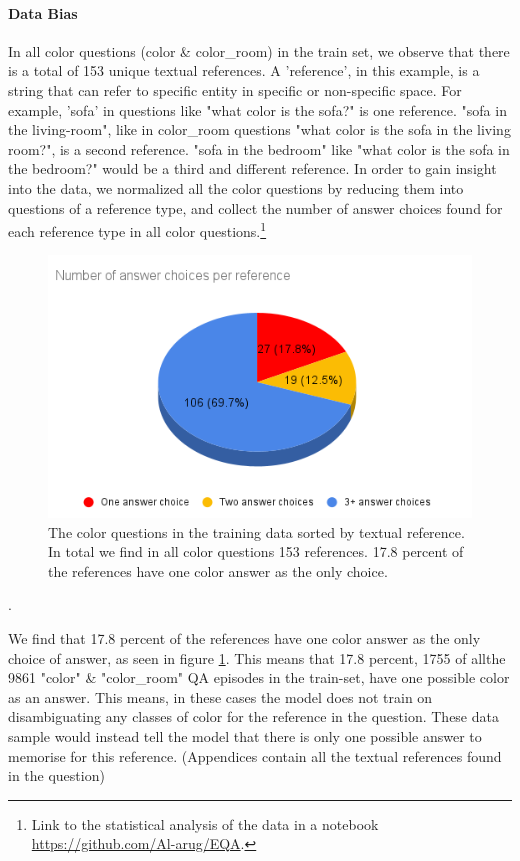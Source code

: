 \paragraph{Data Bias}

In all color questions (color \& color\_room) in the train set, we observe that there is a total of 153  unique textual references. A 'reference', in this example, is a string that can refer to specific entity in specific or non-specific space. For example, 'sofa' in questions like "what color is the sofa?" is one reference. "sofa in the living-room", like in color\_room questions "what color is the sofa in the living room?", is a second reference. "sofa in the bedroom" like "what color is the sofa in the bedroom?" would be a third and different reference. In order to gain insight into the data, we normalized all the color questions by reducing them into questions of a reference type, and collect the number of answer choices found for each reference type in all color questions.\footnote{ Link to the statistical analysis of the data in a notebook  \url{https://github.com/Al-arug/EQA}.} 


\begin{figure}[H]
\centering
\includegraphics[scale=0.5]{images/AnswerRef.png}
\caption{The color questions in the training data sorted by textual reference. In total we find in all color questions 153 references. 17.8 percent of the references have one color answer as the only choice.  }
\label{fig:AnswerRef}
\end{figure}.

We find that 17.8 percent of the references have one color answer as the only choice of answer, as seen in figure \ref{fig:AnswerRef}. This means that 17.8 percent, 1755 of allthe  9861 "color" \& "color\_room" QA episodes in the train-set, have one possible color as an answer. This means, in these cases the model does not train on disambiguating any classes of color for the reference in the question. These data sample would instead tell the model that there is only one possible answer to memorise for this reference. (Appendices contain all the textual references found in the question)

